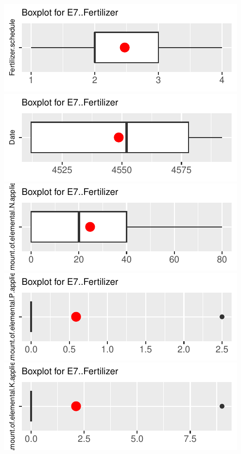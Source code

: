 \documentclass[
]{article}
\begin{document}
\includegraphics{FL_Crop_BMP_QA_single_dataset_files/figure-latex/check-content-of-sheets-7.pdf}
\includegraphics{FL_Crop_BMP_QA_single_dataset_files/figure-latex/check-content-of-sheets-8.pdf}
\includegraphics{FL_Crop_BMP_QA_single_dataset_files/figure-latex/check-content-of-sheets-9.pdf}
\includegraphics{FL_Crop_BMP_QA_single_dataset_files/figure-latex/check-content-of-sheets-10.pdf}
\includegraphics{FL_Crop_BMP_QA_single_dataset_files/figure-latex/check-content-of-sheets-11.pdf}
\end{document}
